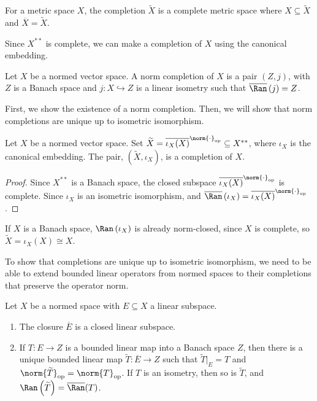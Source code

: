 \documentclass[10pt]{mypackage}
\begin{document}
\begin{definition}
  For a metric space $X$, the completion $\widetilde{X}$ is a complete metric space where $X\subseteq \widetilde{X}$ and $\overline{X} = \widetilde{X}$.
\end{definition}
Since $X^{\ast\ast}$ is complete, we can make a completion of $X$ using the canonical embedding.
\begin{definition}
  Let $X$ be a normed vector space. A norm completion of $X$ is a pair $\left(Z,j\right)$, with $Z$ is a Banach space and $j: X\hookrightarrow Z$ is a linear isometry such that $\overline{\Ran}\left(j\right)= Z$.
\end{definition}
First, we show the existence of a norm completion. Then, we will show that norm completions are unique up to isometric isomorphism.
\begin{proposition}
  Let $X$ be a normed vector space. Set $\widetilde{X} = \overline{\iota_X(X)}^{\norm{\cdot}_{\text{op}}}\subseteq X^{\ast\ast}$, where $\iota_X$ is the canonical embedding. The pair, $\left(\widetilde{X},\iota_X\right)$, is a completion of $X$.
\end{proposition}
\begin{proof}
  Since $X^{\ast\ast}$ is a Banach space, the closed subspace $\overline{\iota_{X}(X)}^{\norm{\cdot}_{\text{op}}}$ is complete. Since $\iota_X$ is an isometric isomorphism, and $\overline{\Ran}\left(\iota_X\right) = \overline{\iota_X(X)}^{\norm{\cdot}_{\text{op}}}$.
\end{proof}
\begin{note}
  If $X$ is a Banach space, $\Ran\left(\iota_X\right)$ is already norm-closed, since $X$ is complete, so $\widetilde{X} = \iota_X(X) \cong X$.
\end{note}
To show that completions are unique up to isometric isomorphism, we need to be able to extend bounded linear operators from normed spaces to their completions that preserve the operator norm.
\begin{proposition}
  Let $X$ be a normed space with $E\subseteq X$ a linear subspace.
  \begin{enumerate}[(1)]
    \item The closure $\overline{E}$ is a closed linear subspace.
    \item If $T: E\rightarrow Z$ is a bounded linear map into a Banach space $Z$, then there is a unique bounded linear map $\widetilde{T}: \overline{E}\rightarrow Z$ such that $\widetilde{T}|_{E} = T$ and $\norm{\widetilde{T}}_{\text{op}} = \norm{T}_{\text{op}}$. If $T$ is an isometry, then so is $\widetilde{T}$, and $\Ran\left(\widetilde{T}\right) = \overline{\Ran}(T)$.
  \end{enumerate}
\end{proposition}
\end{document}
